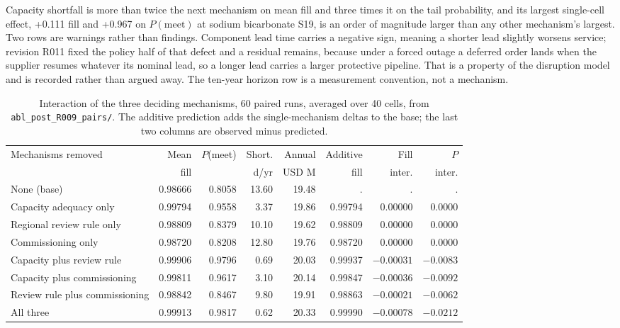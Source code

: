 Capacity shortfall is more than twice the next mechanism on mean fill and three times it on the
tail probability, and its largest single-cell effect, +0.111 fill and +0.967 on $P(\text{meet})$
at sodium bicarbonate S19, is an order of magnitude larger than any other mechanism's largest.
Two rows are warnings rather than findings. Component lead time carries a negative sign, meaning
a shorter lead slightly worsens service; revision R011 fixed the policy half of that defect and a
residual remains, because under a forced outage a deferred order lands when the supplier resumes
whatever its nominal lead, so a longer lead carries a larger protective pipeline. That is a
property of the disruption model and is recorded rather than argued away. The ten-year horizon
row is a measurement convention, not a mechanism.

\begin{table}[htbp]
\centering
\caption{Interaction of the three deciding mechanisms, 60 paired runs, averaged over 40 cells,
from \texttt{abl\_post\_R009\_pairs/}. The additive prediction adds the single-mechanism deltas
to the base; the last two columns are observed minus predicted.}
\label{tab:interaction}
\footnotesize
\setlength{\tabcolsep}{4pt}
\begin{tabular}{@{}lrrrrrrr@{}}
\toprule
Mechanisms removed & Mean & $P$(meet) & Short. & Annual & Additive & Fill & $P$ \\
                   & fill &           & d/yr   & USD M  & fill     & inter. & inter. \\
\midrule
None (base) & 0.98666 & 0.8058 & 13.60 & 19.48 & . & . & . \\
Capacity adequacy only & 0.99794 & 0.9558 & 3.37 & 19.86 & 0.99794 & 0.00000 & 0.0000 \\
Regional review rule only & 0.98809 & 0.8379 & 10.10 & 19.62 & 0.98809 & 0.00000 & 0.0000 \\
Commissioning only & 0.98720 & 0.8208 & 12.80 & 19.76 & 0.98720 & 0.00000 & 0.0000 \\
Capacity plus review rule & 0.99906 & 0.9796 & 0.69 & 20.03 & 0.99937 & $-0.00031$ & $-0.0083$ \\
Capacity plus commissioning & 0.99811 & 0.9617 & 3.10 & 20.14 & 0.99847 & $-0.00036$ & $-0.0092$ \\
Review rule plus commissioning & 0.98842 & 0.8467 & 9.80 & 19.91 & 0.98863 & $-0.00021$ & $-0.0062$ \\
All three & 0.99913 & 0.9817 & 0.62 & 20.33 & 0.99990 & $-0.00078$ & $-0.0212$ \\
\bottomrule
\end{tabular}
\end{table}

